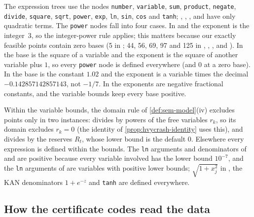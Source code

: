 The expression trees use the nodes \texttt{number}, \texttt{variable}, \texttt{sum}, \texttt{product}, \texttt{negate}, \texttt{divide}, \texttt{square}, \texttt{sqrt}, \texttt{power}, \texttt{exp}, \texttt{ln}, \texttt{sin}, \texttt{cos} and \texttt{tanh}; , , ,  and  have only quadratic terms.
The \texttt{power} nodes fall into four cases.
In  and  the exponent is the integer~$3$, so the integer-power rule applies; this matters because our exactly feasible points contain zero bases (5 in ; 44, 56, 69, 97 and 125 in , , ,  and ).
In  the base is the square of a variable and the exponent is the square of another variable plus $1$, so every \texttt{power} node is defined everywhere (and $0$ at a zero base).
In  the base is the constant $1.02$ and the exponent is a variable times the decimal $-0.142857142857143$, not $-1/7$.
In  the exponents are negative fractional constants, and the variable bounds keep every base positive.

Within the variable bounds, the domain rule of \cref{def:sem-model}(iv) excludes points only in two instances:  divides by powers of the free variables $r_k$, so its domain excludes $r_k=0$ (the identity of \cref{prop:hvycrash-identity} uses this), and  divides by the reserves $R_t$, whose lower bound is the default $0$.
Elsewhere every expression is defined within the bounds.
The \texttt{ln} arguments and denominators of  and  are positive because every variable involved has the lower bound $10^{-7}$, and the \texttt{ln} arguments of  are variables with positive lower bounds; $\sqrt{1+x_j^2}$ in , the KAN denominators $1+e^{-z}$ and \texttt{tanh} are defined everywhere.

\subsection{How the certificate codes read the data}\label{app:semantics-codes}

